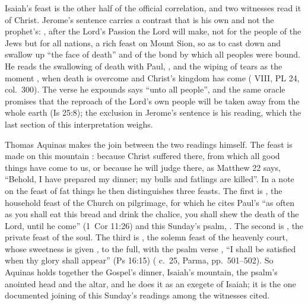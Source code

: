 Isaiah's feast is the other half of the official correlation, and two
witnesses read it of Christ. Jerome's sentence carries a contrast that is his
own and not the prophet's: , after the Lord's Passion the Lord will make, not for the people of
the Jews but for all nations, a rich feast on Mount Sion, so as to cast down
and swallow up ``the face of death'' and of the bond by which all peoples were
bound. He reads the swallowing of death with Paul, , and the wiping of tears as the moment
, when death is overcome
and Christ's kingdom has come ( VIII, PL 24,
col.~300). The verse he expounds says ``unto all people'', and the same
oracle promises that the reproach of the Lord's own people will be taken away
from the whole earth (Is 25:8); the exclusion in Jerome's sentence is his
reading, which the last section of this interpretation weighs.

Thomas Aquinas makes the join between the two readings himself. The feast is
made on this mountain : because Christ suffered there, from
which all good things have come to us, or because he will judge there, as
Matthew 22 says, ``Behold, I have prepared my dinner; my bulls and fatlings are
killed''. In a note on the feast of fat things he then distinguishes three
feasts. The first is , the household
feast of the Church on pilgrimage, for which he cites Paul's ``as often as you
shall eat this bread and drink the chalice, you shall shew the death of the
Lord, until he come'' (1~Cor 11:26) and this Sunday's psalm, . The second is , the
private feast of the soul. The third is , the solemn feast of the heavenly court, whose sweetness is given
, to the full, with the psalm verse , ``I shall be satisfied when thy glory shall appear''
(Ps 16:15) ( c.~25, Parma, pp.~501--502). So
Aquinas holds together the Gospel's dinner, Isaiah's mountain, the psalm's
anointed head and the altar, and he does it as an exegete of Isaiah; it is the
one documented joining of this Sunday's readings among the witnesses cited.

